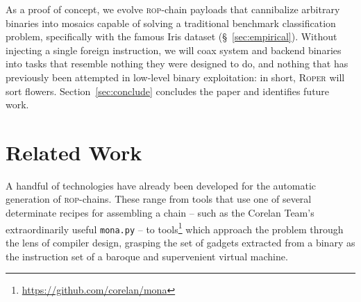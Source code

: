 As a proof of concept, we evolve \textsc{rop}-chain payloads that
cannibalize arbitrary binaries into mosaics capable of solving a
traditional benchmark classification problem, specifically with
the famous Iris dataset (\S~\ref{sec:empirical}). Without
injecting a single foreign instruction, we will coax system and
backend binaries into tasks that resemble nothing they were
designed to do, and nothing that has previously been attempted in
low-level binary exploitation: in short, \textsc{Roper} will sort
flowers. Section~\ref{sec:conclude} concludes the paper and
identifies future work.

\section{Related Work}\label{sec:RopBackgnd}






A handful of technologies have already been developed for the
automatic generation of \textsc{rop}-chains. These range from
tools that use one of several determinate recipes for assembling
a chain -- such as the {Corelan Team}'s extraordinarily useful
\texttt{mona.py} -- to tools\footnote{\url{https://github.com/corelan/mona}} which approach the problem through
the lens of compiler design, grasping the set of gadgets
extracted from a binary as the instruction set of a baroque and
supervenient virtual machine. %

